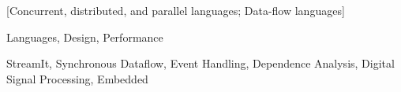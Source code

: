 [Concurrent, distributed, and parallel languages; Data-flow languages]

\begin{terms}
Languages, Design, Performance
\end{terms}

\begin{keywords}
StreamIt, Synchronous Dataflow, Event Handling, Dependence Analysis,
Digital Signal Processing, Embedded
\end{keywords}
